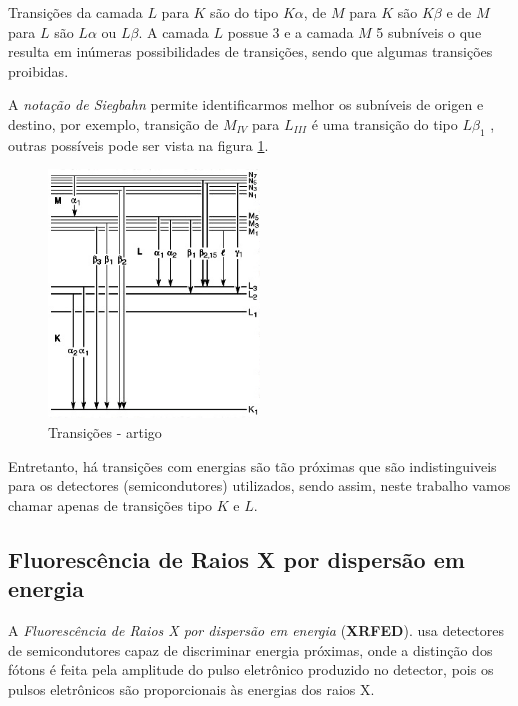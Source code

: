 Transições da camada $L$ para $K$ são do tipo $K\alpha$, de $M$ para $K$ 
são $K\beta$ e de $M$ para $L$ são $L\alpha$ ou $L\beta$. 
A camada $L$ possue 3 e a camada $M$ 5 subníveis o que
resulta em inúmeras possibilidades de transições, sendo que algumas transições
proibidas. 

A \textit{notação de Siegbahn} permite identificarmos melhor os subníveis
de origen e destino, por exemplo, transição de $M_{IV}$ para $L_{III}$ é uma transição do 
tipo $L\beta_1$ \cite{jenkins1991}, outras possíveis pode ser vista na
figura \ref{fig:siegbahn}. 

\begin{figure}[H]
\begin{center} 
  \includegraphics[width=0.5\textwidth]{../inputs/images/Siegbahn.jpg}
  \caption{Transições - artigo \cite{jenkins1991}  \label{fig:siegbahn}}
\end{center}
\end{figure}

Entretanto, há transições com energias são tão próximas 
que são indistinguiveis para os detectores (semicondutores) 
utilizados, sendo assim, neste trabalho vamos chamar apenas de 
transições tipo $K$ e $L$.

\subsection{Fluorescência de Raios X por dispersão em energia}

A \textit{Fluorescência de Raios X por dispersão em energia} (\textbf{XRFED}).
usa detectores de semicondutores capaz de discriminar energia 
próximas, onde a distinção dos fótons é feita pela amplitude do pulso 
eletrônico produzido no detector, pois os pulsos eletrônicos são
proporcionais às energias dos raios X. 


